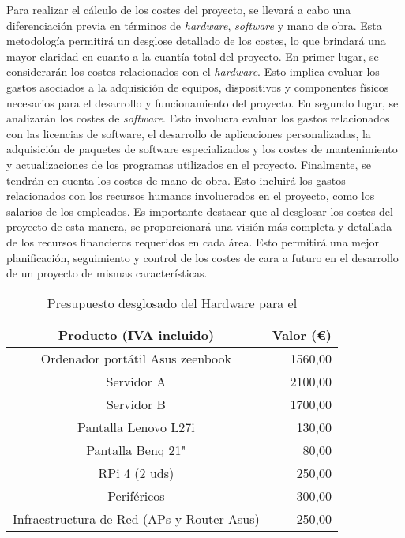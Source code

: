 Para realizar el cálculo de los costes del proyecto, se llevará a cabo una diferenciación previa en términos de \textit{hardware}, \textit{software} y mano de obra. Esta metodología permitirá un desglose detallado de los costes, lo que brindará una mayor claridad en cuanto a la cuantía total del proyecto.  En primer lugar, se considerarán los costes relacionados con el \textit{hardware}. Esto implica evaluar los gastos asociados a la adquisición de equipos, dispositivos y componentes físicos necesarios para el desarrollo y funcionamiento del proyecto. En segundo lugar, se analizarán los costes de \textit{software}. Esto involucra evaluar los gastos relacionados con las licencias de software, el desarrollo de aplicaciones personalizadas, la adquisición de paquetes de software especializados y los costes de mantenimiento y actualizaciones de los programas utilizados en el proyecto. Finalmente, se tendrán en cuenta los costes de mano de obra. Esto incluirá los gastos relacionados con los recursos humanos involucrados en el proyecto, como los salarios de los empleados. Es importante destacar que al desglosar los costes del proyecto de esta manera, se proporcionará una visión más completa y detallada de los recursos financieros requeridos en cada área. Esto permitirá una mejor planificación, seguimiento y control de los costes de cara a futuro en el desarrollo de un proyecto de mismas características.

\begin{table}[ht]
	\centering
	\begin{tabular}{|c|r|}
		\hline
		\rowcolor[HTML]{EFEFEF}
		\textbf{Producto (IVA incluido)}           & \multicolumn{1}{c|}{\cellcolor[HTML]{EFEFEF}\textbf{Valor (€)}} \\ \hline
		Ordenador portátil Asus zeenbook           & 1560,00                                                         \\ \hline
		Servidor  A                                & 2100,00                                                         \\ \hline
		Servidor  B                                & 1700,00                                                         \\ \hline
		Pantalla Lenovo L27i                       & 130,00                                                          \\ \hline
		Pantalla Benq 21"                          & 80,00                                                           \\ \hline
		RPi 4 (2 uds)                              & 250,00                                                          \\ \hline
		Periféricos                                & 300,00                                                          \\ \hline
		Infraestructura de Red (APs y Router Asus) & 250,00                                                          \\ \hline
	\end{tabular}
	\caption{Presupuesto desglosado del Hardware para el }
	\label{tab:costesHardware}
\end{table}

